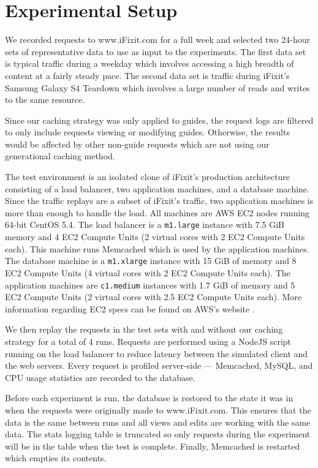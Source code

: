 \documentclass[12pt]{ucthesis}
\begin{document}
\section{Experimental Setup}
We recorded requests to \textsf{www.iFixit.com} for a full week and selected two 24-hour sets of representative data to use as input to the experiments.
The first data set is typical traffic during a weekday which involves accessing a high breadth of content at a fairly steady pace.
The second data set is traffic during \textsf{iFixit}'s Samsung Galaxy S4 Teardown\cite{ifixitGalaxyS4Teardown} which involves a large number of reads and writes to the same resource.

Since our caching strategy was only applied to guides, the request logs are filtered to only include requests viewing or modifying guides.
Otherwise, the results would be affected by other non-guide requests which are not using our generational caching method.

The test environment is an isolated clone of \textsf{iFixit}'s production architecture consisting of a load balancer, two application machines, and a database machine.
Since the traffic replays are a subset of \textsf{iFixit}'s traffic, two application machines is more than enough to handle the load.
All machines are AWS EC2 nodes running 64-bit CentOS 5.4.
The load balancer is a {\tt m1.large} instance with 7.5 GiB memory and 4 EC2 Compute Units (2 virtual cores with 2 EC2 Compute Units each).
This machine runs \textsf{Memcached} which is used by the application machines.
The database machine is a {\tt m1.xlarge} instance with 15 GiB of memory and 8 EC2 Compute Units (4 virtual cores with 2 EC2 Compute Units each).
The application machines are {\tt c1.medium} instances with 1.7 GiB of memory and 5 EC2 Compute Units (2 virtual cores with 2.5 EC2 Compute Units each).
More information regarding EC2 specs can be found on AWS's website \cite{awsInstanceTypes}.

We then replay the requests in the test sets with and without our caching strategy for a total of 4 runs.
Requests are performed using a NodeJS script running on the load balancer to reduce latency between the simulated client and the web servers.
Every request is profiled server-side --- \textsf{Memcached}, \textsf{MySQL}, and CPU usage statistics are recorded to the database.

Before each experiment is run, the database is restored to the state it was in when the requests were originally made to \textsf{www.iFixit.com}.
This ensures that the data is the same between runs and all views and edits are working with the same data.
The stats logging table is truncated so only requests during the experiment will be in the table when the test is complete.
Finally, \textsf{Memcached} is restarted which empties its contents.
\end{document}
